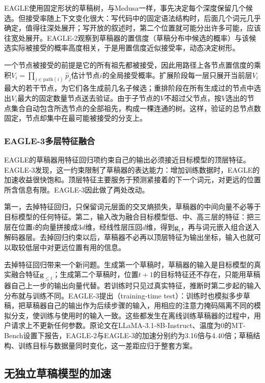 EAGLE使用固定形状的草稿树，与Medusa一样，事先决定每个深度保留几个候选。但接受率随上下文变化很大：写代码中的固定语法结构时，后面几个词元几乎确定，值得往深处展开；写开放的叙述时，第二个位置就可能分出许多可能，应该往宽处展开。EAGLE-2观察到草稿器的置信度（草稿分布中候选的概率）与该候选实际被接受的概率高度相关，于是用置信度近似接受率，动态决定树形。

一个节点被接受的前提是它的所有祖先都被接受，因此用路径上各节点置信度的乘积$V_i=\prod_{j\in\mathrm{path}(i)}\hat p_j$估计节点$i$的全局接受概率。扩展阶段每一层只展开当前层$V_i$最大的若干节点，为它们各生成前几名子候选；重排阶段在所有生成过的节点中选出$V_i$最大的固定数量节点送去验证。由于子节点的$V$不超过父节点，按$V$选出的节点集合自动包含所选节点的全部祖先，构成一棵连通的树。这样，验证的总节点数固定，节点却集中在最可能被接受的分支上。

\subsubsection{EAGLE-3多层特征融合}
\label{sec:nlp-inference-eagle3}

EAGLE的草稿器用特征回归项约束自己的输出必须接近目标模型的顶层特征。EAGLE-3发现，这一约束限制了草稿器的表达能力：增加训练数据时，EAGLE的加速收益很快饱和。顶层特征主要服务于预测紧接着的下一个词元，对更远的位置所含信息有限。EAGLE-3因此做了两处改动。

第一，去掉特征回归，只保留词元层面的交叉熵损失，草稿器的中间向量不必等于目标模型的任何特征。第二，输入改为融合目标模型低、中、高三层的特征：把三层在位置$i$的向量拼接成$3d$维，经线性层压回$d$维，得到$\bm g_i$，再与词元嵌入组合送入解码器层。去掉回归约束以后，草稿器不必再以顶层特征为输出坐标，输入也就可以取较低层中对更远位置有用的信息。

去掉特征回归带来一个新问题。生成第一个草稿时，草稿器的输入是目标模型的真实融合特征$\bm g_{\leq t}$；生成第二个草稿时，位置$t+1$的目标特征还不存在，只能用草稿器自己上一步的输出向量代替。若训练时只见过真实特征，推断时第二步起的输入分布就与训练不同。EAGLE-3提出（training-time test）：训练时也模拟多步草稿，把草稿器自己的输出作为后续步骤的输入，用相应的注意力掩码隔离不同的模拟分支，使训练与使用时的输入一致。这些都发生在离线训练草稿器的过程中，用户请求上不更新任何参数。原论文在LLaMA-3.1-8B-Instruct、温度为0的MT-Bench设置下报告，EAGLE-2与EAGLE-3的加速分别约为3.16倍与4.40倍；草稿结构、训练目标与数据量同时变化，这一差距应归于整套方案。

\subsection{无独立草稿模型的加速}
\label{sec:nlp-inference-draftless}

